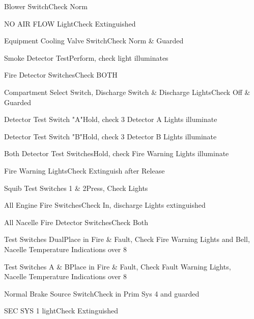 \documentclass[sim-use, blue_items]{checklist}
\begin{document}
\begin{continuedchecklist}
	 {
		\item{Blower Switch}{Check Norm}
		\item{NO AIR FLOW Light}{Check Extinguished}
		\item{Equipment Cooling Valve Switch}{Check Norm \& Guarded}
		\item{Smoke Detector Test}{Perform, check light illuminates}
	}
\end{continuedchecklist}

\begin{continuedchecklist}
	 {
		\item{Fire Detector Switches}{Check BOTH}
		\item{Compartment Select Switch, Discharge Switch \& Discharge Lights}{Check Off \& Guarded}
		\item{Detector Test Switch "A"}{Hold, check 3 Detector A Lights illuminate}	
		\item{Detector Test Switch "B"}{Hold, check 3 Detector B Lights illuminate}	
		\item{Both Detector Test Switches}{Hold, check Fire Warning Lights illuminate}
		\item{Fire Warning Lights}{Check Extinguish after Release}
		\item{Squib Test Switches 1 \& 2}{Press, Check Lights}
	}
	 {
		\item{All Engine Fire Switches}{Check In, discharge Lights extinguished}
		\item{All Nacelle Fire Detector Switches}{Check Both}
		\item{Test Switches Dual}{Place in Fire \& Fault, Check Fire Warning Lights and Bell,\\Nacelle Temperature Indications over 8}
		\item{Test Switches A \& B}{Place in Fire \& Fault, Check Fault Warning Lights,\\Nacelle Temperature Indications over 8}
	}
	 {
		\item{Normal Brake Source Switch}{Check in Prim Sys 4 and guarded}
		\item{SEC SYS 1 light}{Check Extinguished}
}
\end{continuedchecklist}
\end{document}
